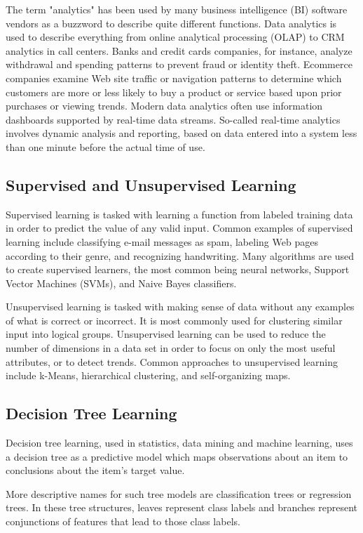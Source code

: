 \documentclass[11pt]{article} %
\begin{document}
The term "analytics" has been used by many business intelligence (BI) software vendors as a buzzword to describe quite different functions. Data analytics is used to describe everything from online analytical processing (OLAP) to CRM analytics in call centers. Banks and credit cards companies, for instance, analyze withdrawal and spending patterns to prevent fraud or identity theft. Ecommerce companies examine Web site traffic or navigation patterns to determine which customers are more or less likely to buy a product or service based upon prior purchases or viewing trends. Modern data analytics often use information dashboards supported by real-time data streams. So-called real-time analytics involves dynamic analysis and reporting, based on data entered into a system less than one minute before the actual time of use.

\subsection{Supervised and Unsupervised Learning}
Supervised learning is tasked with learning a function from labeled training data in order to predict the value of any valid input. Common examples of supervised learning include classifying e-mail messages as spam, labeling Web pages according to their genre, and recognizing handwriting. Many algorithms are used to create supervised learners, the most common being neural networks, Support Vector Machines (SVMs), and Naive Bayes classifiers.

Unsupervised learning is tasked with making sense of data without any examples of what is correct or incorrect. It is most commonly used for clustering similar input into logical groups. Unsupervised learning  can be used to reduce the number of dimensions in a data set in order to focus on only the most useful attributes, or to detect trends. Common approaches to unsupervised learning include k-Means, hierarchical clustering, and self-organizing maps.

\subsection{Decision Tree Learning}
Decision tree learning, used in statistics, data mining and machine learning, uses a decision tree as a predictive model which maps observations about an item to conclusions about the item's target value.

More descriptive names for such tree models are classification trees or regression trees. In these tree structures, leaves represent class labels and branches represent conjunctions of features that lead to those class labels.
\end{document}
